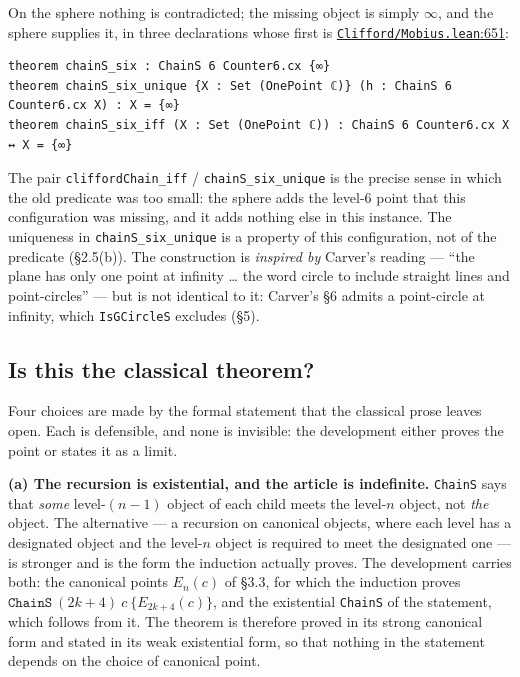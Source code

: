 \documentclass[11pt]{article}
\theoremstyle{definition}
\theoremstyle{remark}
\begin{document}
On the sphere nothing is contradicted; the missing object is simply $\infty$, and the sphere supplies it, in three declarations whose first is \href{https://github.com/jpbald93/paperl_clifford_chain/blob/e1ae145c2565cc98816635387412edc0a740c27c/Clifford/Mobius.lean\#L651}{\texttt{Clifford/\allowbreak Mobius.lean}:651}:

\begin{Verbatim}
theorem chainS_six : ChainS 6 Counter6.cx {∞}
theorem chainS_six_unique {X : Set (OnePoint ℂ)} (h : ChainS 6 Counter6.cx X) : X = {∞}
theorem chainS_six_iff (X : Set (OnePoint ℂ)) : ChainS 6 Counter6.cx X ↔ X = {∞}
\end{Verbatim}

The pair \texttt{cliffordChain\_\allowbreak iff} / \texttt{chainS\_\allowbreak six\_\allowbreak unique} is the precise sense in which the old predicate was
too small: the sphere adds the level-6 point that this configuration was missing, and it adds nothing
else in this instance. The uniqueness in \texttt{chainS\_\allowbreak six\_\allowbreak unique} is a property of this configuration, not of
the predicate (\S{}2.5(b)). The construction is \emph{inspired by} Carver's reading --- ``the plane has only one
point at infinity \ldots{} the word circle to include straight lines and point-circles'' --- but is not identical
to it:
Carver's \S{}6 admits a point-circle at infinity, which \texttt{IsGCircleS} excludes (\S{}5).

\hypertarget{is-this-the-classical-theorem}{%
\subsection{Is this the classical theorem?}\label{is-this-the-classical-theorem}}

Four choices are made by the formal statement that the classical prose leaves open. Each is defensible,
and none is invisible: the development either proves the point or states it as a limit.

\textbf{(a) The recursion is existential, and the article is indefinite.} \texttt{ChainS} says that \emph{some} level-\((n-1)\)
object of each child meets the level-\(n\) object, not \emph{the} object. The alternative --- a recursion on
canonical objects, where each level has a designated object and the level-\(n\) object is required to meet
the designated one --- is stronger and is the form the induction actually proves. The development carries
both: the canonical points \(E_n(c)\) of \S{}3.3, for which the induction proves
\(\texttt{ChainS}\ (2k+4)\ c\ \{E_{2k+4}(c)\}\), and the existential \texttt{ChainS} of the statement, which follows from it. The
theorem is therefore proved in its strong canonical form and stated in its weak existential form, so that
nothing in the statement depends on the choice of canonical point.
\end{document}
